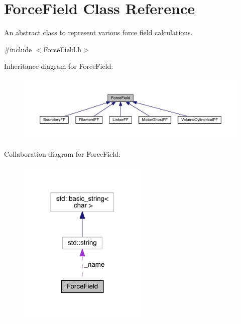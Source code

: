 \hypertarget{classForceField}{\section{Force\+Field Class Reference}
\label{classForceField}
}


An abstract class to represent various force field calculations.  




{\ttfamily \#include $<$Force\+Field.\+h$>$}



Inheritance diagram for Force\+Field\+:
\nopagebreak
\begin{figure}[H]
\begin{center}
\leavevmode
\includegraphics[width=350pt]{classForceField__inherit__graph}
\end{center}
\end{figure}


Collaboration diagram for Force\+Field\+:\nopagebreak
\begin{figure}[H]
\begin{center}
\leavevmode
\includegraphics[width=174pt]{classForceField__coll__graph}
\end{center}
\end{figure}
